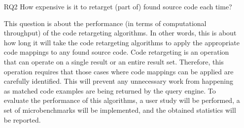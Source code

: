 \begin{itemize}
	\item[RQ2] How expensive is it to retarget (part of) found source code each time?
	
	This question is about the performance (in terms of computational throughput) of the code 
	retargeting algorithms. In other words, this is about how long it will take the code retargeting 
	algorithms to apply the appropriate code mappings to any found source code. Code retargeting is 
	an operation that can operate on a single result or an entire result set. Therefore, this 
	operation requires that those cases where code mappings can be applied are 
	carefully identified. This will prevent any unnecessary work from happening as matched code 
	examples are being returned by the query engine. To evaluate the performance of this algorithms, 
	a user study will be performed, a set of microbenchmarks will be implemented, and the obtained statistics 
	will be reported.
	
	

\end{itemize}
